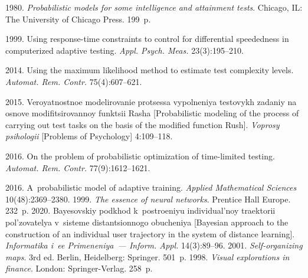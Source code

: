   \begin{multicols}{2}

\renewcommand{\bibname}{\protect\rmfamily References}

{\small\frenchspacing
 {%
 \begin{thebibliography}{99}

 1980. \textit{Probabilistic models for some intelligence and attainment tests}. 
Chicago, IL: The University of Chicago Press. 199~p. 

 1999. Using response-time 
constraints to control for differential speededness in computerized adaptive testing. \textit{Appl. 
Psych. Meas.} 23(3):195--210.

 2014. Using the maximum likelihood method to 
estimate test complexity levels. \textit{Automat. Rem. Contr.} 75(4):607--621.

2015. Veroyatnostnoe mo\-de\-li\-ro\-va\-nie protsessa vypolneniya testovykh zadaniy na osno\-ve 
modifitsirovannoy funktsii Rasha [Probabilistic modeling of the process of carrying out test tasks 
on the basis of the modified function Rush]. \textit{Voprosy psihologii} [Problems of 
Psychology] 4:109--118.

 2016. On the problem of probabilistic 
optimization of time-limited testing. \textit{Automat. Rem. Contr.} 77(9):1612--1621.

 2016. A~probabilistic model of adaptive training. \textit{Applied 
Mathematical Sciences} 10(48):2369--2380.
 1999. \textit{The essence of neural networks}. Prentice Hall Europe. 232~p.
 2020. 
Bayesovskiy podkhod k~postroeniyu individual'noy traektorii pol'zovatelya v~sisteme 
dis\-tan\-tsi\-on\-no\-go obucheniya [Bayesian approach to the construction of an individual user 
trajectory in the system of distance learning]. \textit{Informatika i~ee Primeneniya~--- Inform. 
Appl.} 14(3):89--96.
 2001. \textit{Self-organizing maps}. 3rd ed. Berlin, Heidelberg: Springer. 
501~p.
 1998. \textit{Visual explorations in finance}. London: 
Springer-Verlag. 258~p.


\end{thebibliography}}}
\end{multicols}

